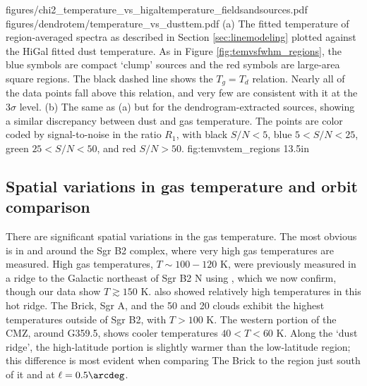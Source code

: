 \FigureTwo
{figures/chi2_temperature_vs_higaltemperature_fieldsandsources.pdf} %
{figures/dendrotem/temperature_vs_dusttem.pdf} %
{(a) The fitted temperature of region-averaged spectra as described in
Section \ref{sec:linemodeling} plotted against the HiGal fitted dust
temperature.  As in Figure \ref{fig:temvsfwhm_regions}, the blue symbols are
compact `clump' sources and the red symbols are large-area square regions.  The
black dashed line shows the $T_g = T_d$ relation.  Nearly all of the data
points fall above this relation, and very few are consistent with it at the
3$\sigma$ level.
(b) The same as (a) but for the dendrogram-extracted sources, showing a similar
discrepancy between dust and gas temperature.  The points are color coded by
signal-to-noise in the
ratio $R_1$, with black $S/N < 5$, blue $5 < S/N < 25$, green $25 < S/N < 50$,
and red $S/N > 50$.  }
{fig:temvstem_regions}
{1}{3.5in}

\subsection{Spatial variations in gas temperature and orbit comparison}
There are significant spatial variations in the gas temperature.  The most
obvious is in and around the Sgr B2 complex, where very high gas temperatures
are measured.  High gas temperatures, $T\sim100-120$ K, were previously
measured in a ridge to the Galactic northeast of Sgr B2 N using \methylcyanide
\citep[][Figure 4b]{de-Vicente1997a}, which we now confirm, though our data
show $T\gtrsim150$ K.  \citet{Ott2014a} also showed relatively high \ammonia
temperatures in this hot ridge.
The Brick, Sgr A, and the 50 \kms and 20 \kms clouds exhibit the
highest temperatures outside of Sgr B2, with $T>100$ K.  The western portion of the
CMZ, around G359.5, shows cooler temperatures $40 < T < 60$ K.  
Along the `dust ridge', the high-latitude portion is slightly warmer than the
low-latitude region; this difference is most evident when comparing The Brick
to the region just south of it and at $\ell=0.5\arcdeg$.



